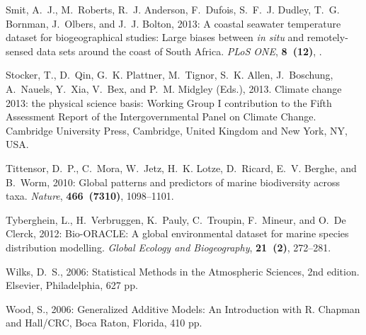 \documentclass[]{ametsoc}
\begin{document}
\begin{thebibliography}{23}
Smit, A.~J., M.~Roberts, R.~J. Anderson, F.~Dufois, S.~F.~J. Dudley, T.~G.
  Bornman, J.~Olbers, and J.~J. Bolton, 2013: {A coastal seawater temperature
  dataset for biogeographical studies: Large biases between \textit{in situ} and
  remotely-sensed data sets around the coast of South Africa}. \textit{PLoS
  ONE}, \textbf{8~(12)}, .

Stocker, T., D.~Qin, G.~K. Plattner, M.~Tignor, S.~K. Allen, J.~Boschung,
  A.~Nauels, Y.~Xia, V.~Bex, and P.~M. Midgley (Eds.), 2013. {Climate change
  2013: the physical science basis: Working Group I contribution to the Fifth
  Assessment Report of the Intergovernmental Panel on Climate Change}.
  Cambridge University Press, Cambridge, United Kingdom and New York, NY, USA.

Tittensor, D.~P., C.~Mora, W.~Jetz, H.~K. Lotze, D.~Ricard, E.~V. Berghe, and
  B.~Worm, 2010: {Global patterns and predictors of marine biodiversity across
  taxa}. \textit{Nature}, \textbf{466~(7310)}, 1098--1101.

Tyberghein, L., H.~Verbruggen, K.~Pauly, C.~Troupin, F.~Mineur, and O.~{De
  Clerck}, 2012: {Bio-ORACLE: A global environmental dataset for marine species
  distribution modelling}. \textit{Global Ecology and Biogeography},
  \textbf{21~(2)}, 272--281.

Wilks, D.~S., 2006: {Statistical Methods in the Atmospheric Sciences, 2nd edition}.
  Elsevier, Philadelphia, 627 pp.

Wood, S., 2006: {Generalized Additive Models: An Introduction with R}. Chapman
  and Hall/CRC, Boca Raton, Florida, 410 pp.


\end{thebibliography}
\end{document}
